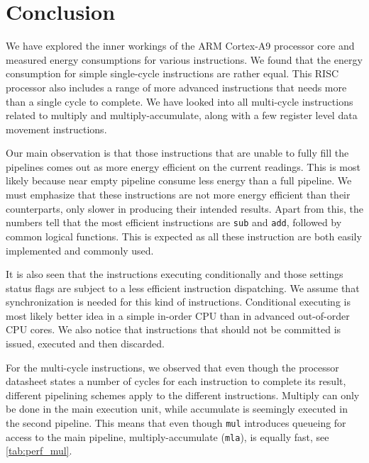 \section{Conclusion}
We have explored the inner workings of the ARM Cortex-A9 processor core and
measured energy consumptions for various instructions. We found that the energy
consumption for simple single-cycle instructions are rather equal. This RISC
processor also includes a range of more advanced instructions that needs more
than a single cycle to complete. We have looked into all multi-cycle
instructions related to multiply and multiply-accumulate, along with a few
register level data movement instructions.

Our main observation is that those instructions that are unable to fully fill
the pipelines comes out as more energy efficient on the current readings. This
is most likely because near empty pipeline consume less energy than a full
pipeline. We must emphasize that these instructions are not more energy
efficient than their counterparts, only slower in producing their intended
results. Apart from this, the numbers tell that the most efficient instructions
are \texttt{sub} and \texttt{add}, followed by common logical functions. This
is expected as all these instruction are both easily implemented and commonly
used.

It is also seen that the instructions executing conditionally and those settings
status flags are subject to a less efficient instruction dispatching. We assume
that synchronization is needed for this kind of instructions. Conditional
executing is most likely better idea in a simple in-order CPU than in advanced
out-of-order CPU cores. We also notice that instructions that should not be
committed is issued, executed and then discarded.

For the multi-cycle instructions, we observed that even though the processor
datasheet\cite{armtech} states a number of cycles for each instruction to
complete its result, different pipelining schemes apply to the different
instructions. Multiply can only be done in the main execution unit, while
accumulate is seemingly executed in the second pipeline. This means that even
though \texttt{mul} introduces queueing for access to the main pipeline,
multiply-accumulate (\texttt{mla}), is equally fast, see
\autoref{tab:perf_mul}.

